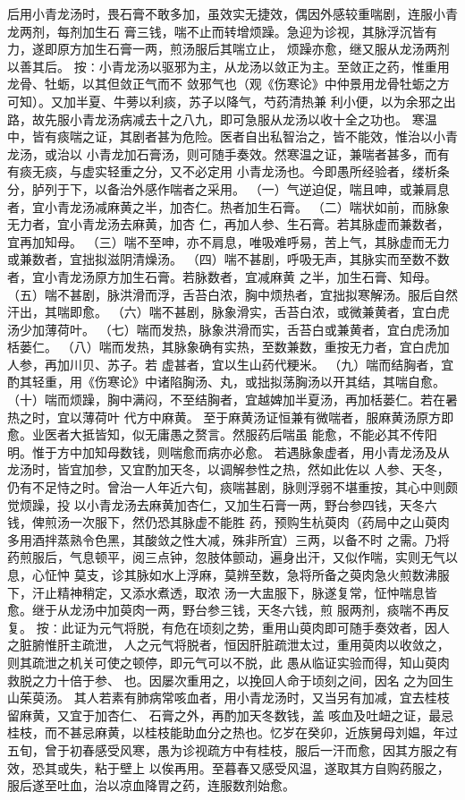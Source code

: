 \documentclass[a4paper,12pt,UTF8,twoside]{ctexbook}
\begin{document}
后用小青龙汤时，畏石膏不敢多加，虽效实无捷效，偶因外感较重喘剧，连服小青龙两剂，每剂加生石 
膏三钱，喘不止而转增烦躁。急迎为诊视，其脉浮沉皆有力，遂即原方加生石膏一两，煎汤服后其喘立止， 
烦躁亦愈，继又服从龙汤两剂以善其后。 
按∶小青龙汤以驱邪为主，从龙汤以敛正为主。至敛正之药，惟重用龙骨、牡蛎，以其但敛正气而不 
敛邪气也（观《伤寒论》中仲景用龙骨牡蛎之方可知）。又加半夏、牛蒡以利痰，苏子以降气，芍药清热兼 
利小便，以为余邪之出路，故先服小青龙汤病减去十之八九，即可急服从龙汤以收十全之功也。 
寒温中，皆有痰喘之证，其剧者甚为危险。医者自出私智治之，皆不能效，惟治以小青龙汤，或治以 
小青龙加石膏汤，则可随手奏效。然寒温之证，兼喘者甚多，而有有痰无痰，与虚实轻重之分，又不必定用 
小青龙汤也。今即愚所经验者，缕析条分，胪列于下，以备治外感作喘者之采用。 
（一）气逆迫促，喘且呻，或兼肩息者，宜小青龙汤减麻黄之半，加杏仁。热者加生石膏。 
（二）喘状如前，而脉象无力者，宜小青龙汤去麻黄，加杏 
仁，再加人参、生石膏。若其脉虚而兼数者，宜再加知母。 
（三）喘不至呻，亦不肩息，唯吸难呼易，苦上气，其脉虚而无力或兼数者，宜拙拟滋阴清燥汤。 
（四）喘不甚剧，呼吸无声，其脉实而至数不数者，宜小青龙汤原方加生石膏。若脉数者，宜减麻黄 
之半，加生石膏、知母。 
（五）喘不甚剧，脉洪滑而浮，舌苔白浓，胸中烦热者，宜拙拟寒解汤。服后自然汗出，其喘即愈。 
（六）喘不甚剧，脉象滑实，舌苔白浓，或微兼黄者，宜白虎汤少加薄荷叶。 
（七）喘而发热，脉象洪滑而实，舌苔白或兼黄者，宜白虎汤加栝蒌仁。 
（八）喘而发热，其脉象确有实热，至数兼数，重按无力者，宜白虎加人参，再加川贝、苏子。若 
虚甚者，宜以生山药代粳米。 
（九）喘而结胸者，宜酌其轻重，用《伤寒论》中诸陷胸汤、丸，或拙拟荡胸汤以开其结，其喘自愈。 
（十）喘而烦躁，胸中满闷，不至结胸者，宜越婢加半夏汤，再加栝蒌仁。若在暑热之时，宜以薄荷叶 
代方中麻黄。 
至于麻黄汤证恒兼有微喘者，服麻黄汤原方即愈。业医者大抵皆知，似无庸愚之赘言。然服药后喘虽 
能愈，不能必其不传阳明。惟于方中加知母数钱，则喘愈而病亦必愈。 
若遇脉象虚者，用小青龙汤及从龙汤时，皆宜加参，又宜酌加天冬，以调解参性之热，然如此佐以 
人参、天冬，仍有不足恃之时。曾治一人年近六旬，痰喘甚剧，脉则浮弱不堪重按，其心中则颇觉烦躁，投 
以小青龙汤去麻黄加杏仁，又加生石膏一两，野台参四钱，天冬六钱，俾煎汤一次服下，然仍恐其脉虚不能胜 
药，预购生杭萸肉（药局中之山萸肉多用酒拌蒸熟令色黑，其酸敛之性大减，殊非所宜）三两，以备不时 
之需。乃将药煎服后，气息顿平，阅三点钟，忽肢体颤动，遍身出汗，又似作喘，实则无气以息，心怔忡 
莫支，诊其脉如水上浮麻，莫辨至数，急将所备之萸肉急火煎数沸服下，汗止精神稍定，又添水煮透，取浓 
汤一大盅服下，脉遂复常，怔忡喘息皆愈。继于从龙汤中加萸肉一两，野台参三钱，天冬六钱，煎 
服两剂，痰喘不再反复。 
按∶此证为元气将脱，有危在顷刻之势，重用山萸肉即可随手奏效者，因人之脏腑惟肝主疏泄， 
人之元气将脱者，恒因肝脏疏泄太过，重用萸肉以收敛之，则其疏泄之机关可使之顿停，即元气可以不脱，此 
愚从临证实验而得，知山萸肉救脱之力十倍于参、 也。因屡次重用之，以挽回人命于顷刻之间，因名 
之为回生山茱萸汤。 
其人若素有肺病常咳血者，用小青龙汤时，又当另有加减，宜去桂枝留麻黄，又宜于加杏仁、 
石膏之外，再酌加天冬数钱，盖 
咳血及吐衄之证，最忌桂枝，而不甚忌麻黄，以桂枝能助血分之热也。忆岁在癸卯，近族舅母刘媪，年过 
五旬，曾于初春感受风寒，愚为诊视疏方中有桂枝，服后一汗而愈，因其方服之有效，恐其或失，粘于壁上 
以俟再用。至暮春又感受风温，遂取其方自购药服之，服后遂至吐血，治以凉血降胃之药，连服数剂始愈。 
\end{document}
